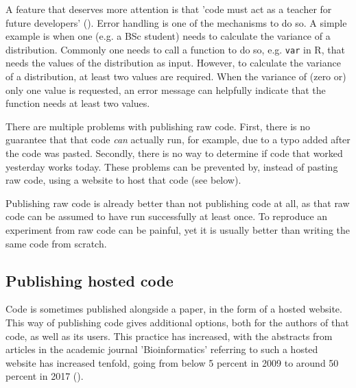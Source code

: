 A feature that deserves more attention
is that 'code must act as a teacher for future developers' (\cite{sadowski2018modern}).
Error handling is one of the mechanisms to do so.
A simple example is when one (e.g. a BSc student) 
needs to calculate the variance of a distribution.
Commonly one needs to call a function to do so, 
e.g. \verb|var| in R, that needs the values of the distribution
as input.
However, to calculate the variance of a distribution, at least two values
are required. 
When the variance of (zero or) only one value is requested,
an error message can helpfully indicate that the function 
needs at least two values.


There are multiple problems with publishing raw code.
First, there is no guarantee that that code \emph{can} actually
run, for example, due to a typo added after the code was pasted.
Secondly, there is no way to determine if code that worked yesterday
works today. These problems can be prevented by, instead of
pasting raw code, using a website to host that code (see below).


Publishing raw code is already better than not publishing code at all,
as that raw code can be assumed to have run successfully at least once.
To reproduce an experiment from raw code can be painful, 
yet it is usually better than writing the same code from scratch.

\subsection{Publishing hosted code}

Code is sometimes published alongside a paper, 
in the form of a hosted website.
This way of publishing code gives additional options,
both for the authors of that code, as well as its users.
This practice has increased,
with the abstracts from articles in the academic journal
'Bioinformatics' referring to such a hosted website
has increased tenfold, going from below 5 percent in 2009 
to around 50 percent in 2017 (\cite{russell2018large}).

